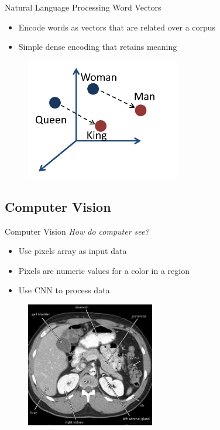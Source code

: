 \documentclass[10pt]{beamer}
\begin{document}
\begin{frame}{Natural Language Processing}
Word Vectors
	\begin{itemize}
		\item Encode words as vectors that are related over a corpus
		\item Simple dense encoding that retains meaning
	\end{itemize}
			\begin{figure}
			\includegraphics[width=0.6\textwidth, center, trim=0cm 0cm 0 0cm]{images/NLP.png}
	\end{figure}
\end{frame}

\subsection{Computer Vision}

\begin{frame}{Computer Vision}
\emph{How do computer see?}
	\begin{itemize}
	  	\item Use pixels array as input data
    	\item Pixels are numeric values for a color in a region
		\item Use CNN to process data
	\end{itemize}
	\begin{figure}
		\includegraphics[width=0.5\textwidth, center, trim=0cm 0cm 0 0cm]{images/CT_scan.jpeg}
	\end{figure}
\end{frame}
\end{document}
